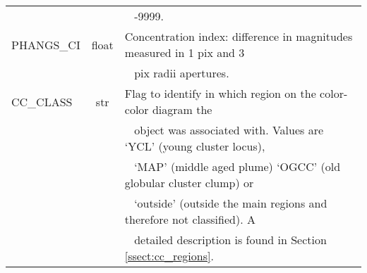 \begin{table*}
\begin{tabular}{lcl}
 &  &  \,\,\, -9999. \\ 
PHANGS\_CI & float & Concentration index: difference in magnitudes measured in 1 pix and 3 \\ 
 &  &  \,\,\, pix radii apertures. \\ 
CC\_CLASS & str & Flag to identify in which region on the color-color diagram the \\ 
 &  &  \,\,\, object was associated with. Values are `YCL' (young cluster locus), \\ 
 &  &  \,\,\, `MAP' (middle aged plume) `OGCC' (old globular cluster clump) or \\ 
 &  &  \,\,\, `outside' (outside the main regions and therefore not classified). A \\ 
 &  &  \,\,\, detailed description is found in Section\,\ref{ssect:cc_regions}. \\ 
\hline
\end{tabular} 
\end{table*}
%